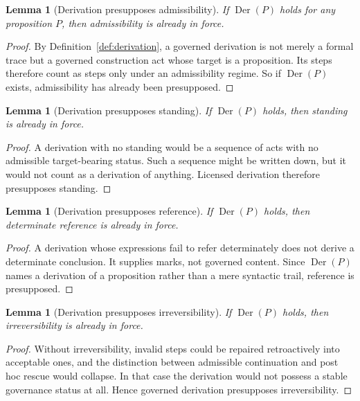\documentclass[11pt]{article}
\newtheorem{lemma}[theorem]{Lemma}
\theoremstyle{definition}
\theoremstyle{remark}
\newcommand{\Der}{\operatorname{Der}}
\begin{document}
\begin{lemma}[Derivation presupposes admissibility]
If $\Der(P)$ holds for any proposition $P$, then admissibility is already in force.
\end{lemma}

\begin{proof}
By Definition~\ref{def:derivation}, a governed derivation is not merely a formal trace but a governed construction act whose target is a proposition. Its steps therefore count as steps only under an admissibility regime. So if $\Der(P)$ exists, admissibility has already been presupposed.
\end{proof}

\begin{lemma}[Derivation presupposes standing]
If $\Der(P)$ holds, then standing is already in force.
\end{lemma}

\begin{proof}
A derivation with no standing would be a sequence of acts with no admissible target-bearing status. Such a sequence might be written down, but it would not count as a derivation of anything. Licensed derivation therefore presupposes standing.
\end{proof}

\begin{lemma}[Derivation presupposes reference]
If $\Der(P)$ holds, then determinate reference is already in force.
\end{lemma}

\begin{proof}
A derivation whose expressions fail to refer determinately does not derive a determinate conclusion. It supplies marks, not governed content. Since $\Der(P)$ names a derivation of a proposition rather than a mere syntactic trail, reference is presupposed.
\end{proof}

\begin{lemma}[Derivation presupposes irreversibility]
If $\Der(P)$ holds, then irreversibility is already in force.
\end{lemma}

\begin{proof}
Without irreversibility, invalid steps could be repaired retroactively into acceptable ones, and the distinction between admissible continuation and post hoc rescue would collapse. In that case the derivation would not possess a stable governance status at all. Hence governed derivation presupposes irreversibility.
\end{proof}
\end{document}
